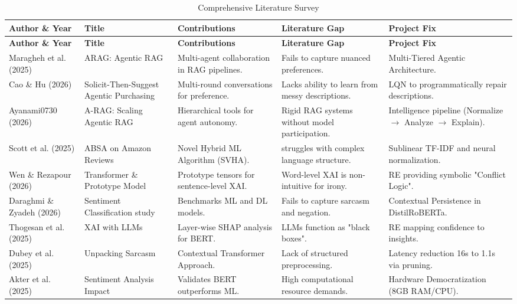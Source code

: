 \documentclass[11pt,oneside]{scrbook}
\begin{document}
\begin{longtable}{p{2.2cm}p{2.5cm}p{2.5cm}p{3.2cm}p{3.2cm}}
\caption{Comprehensive Literature Survey} \\
\toprule
\textbf{Author \& Year} & \textbf{Title} & \textbf{Contributions} & \textbf{Literature Gap} & \textbf{Project Fix} \\
\midrule
\endfirsthead
\toprule
\textbf{Author \& Year} & \textbf{Title} & \textbf{Contributions} & \textbf{Literature Gap} & \textbf{Project Fix} \\
\midrule
\endhead
\bottomrule
\endfoot
Maragheh et al. (2025) & ARAG: Agentic RAG & Multi-agent collaboration in RAG pipelines. & Fails to capture nuanced preferences. & Multi-Tiered Agentic Architecture. \\
\addlinespace
Cao \& Hu (2026) & Solicit-Then-Suggest Agentic Purchasing & Multi-round conversations for preference. & Lacks ability to learn from messy descriptions. & LQN to programmatically repair descriptions. \\
\addlinespace
Ayanami0730 (2026) & A-RAG: Scaling Agentic RAG & Hierarchical tools for agent autonomy. & Rigid RAG systems without model participation. & Intelligence pipeline (Normalize $\to$ Analyze $\to$ Explain). \\
\addlinespace
Scott et al. (2025) & ABSA on Amazon Reviews & Novel Hybrid ML Algorithm (SVHA). & struggles with complex language structure. & Sublinear TF-IDF and neural normalization. \\
\addlinespace
Wen \& Rezapour (2026) & Transformer \& Prototype Model & Prototype tensors for sentence-level XAI. & Word-level XAI is non-intuitive for irony. & RE providing symbolic "Conflict Logic". \\
\addlinespace
Daraghmi \& Zyadeh (2026) & Sentiment Classification study & Benchmarks ML and DL models. & Fails to capture sarcasm and negation. & Contextual Persistence in DistilRoBERTa. \\
\addlinespace
Thogesan et al. (2025) & XAI with LLMs & Layer-wise SHAP analysis for BERT. & LLMs function as "black boxes". & RE mapping confidence to insights. \\
\addlinespace
Dubey et al. (2025) & Unpacking Sarcasm & Contextual Transformer Approach. & Lack of structured preprocessing. & Latency reduction 16s to 1.1s via pruning. \\
\addlinespace
Akter et al. (2025) & Sentiment Analysis Impact & Validates BERT outperforms ML. & High computational resource demands. & Hardware Democratization (8GB RAM/CPU). \\

\end{longtable}
\end{document}

